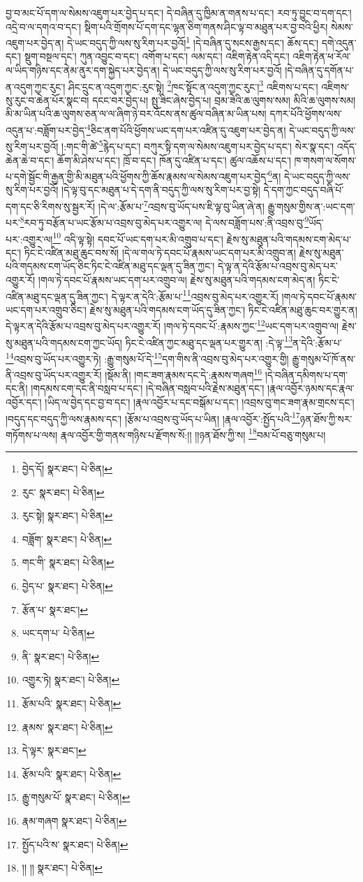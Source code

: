བྱ་བ་མང་པོ་དག་ལ་སེམས་འཇུག་པར་བྱེད་པ་དང་། དེ་བཞིན་དུ་ཁྱིམ་ན་གནས་པ་དང་། རབ་ཏུ་བྱུང་བ་དག་དང་། འདྲེ་བ་ལ་དགའ་བ་དང་། སྡིག་པའི་གྲོགས་པོ་དག་དང་ལྷན་ཅིག་གནས་ཤིང་ལྟ་བ་མཐུན་པར་བྱ་བའི་ཕྱིར། སེམས་འཇུག་པར་བྱེད་ན། དེ་ཡང་བདུད་ཀྱི་ལས་སུ་རིག་པར་བྱའོ།\footnote{བྱེད་དོ།  སྣར་ཐང་།  པེ་ཅིན། } །དེ་བཞིན་དུ་སངས་རྒྱས་དང་། ཆོས་དང་། དགེ་འདུན་དང་། སྡུག་བསྔལ་དང་། ཀུན་འབྱུང་བ་དང་། འགོག་པ་དང་། ལམ་དང་། འཇིག་རྟེན་འདི་དང་། འཇིག་རྟེན་ཕ་རོལ་ལ་ཡིད་གཉིས་དང་ནེམ་ནུར་དག་སྐྱེད་པར་བྱེད་ན། དེ་ཡང་བདུད་ཀྱི་ལས་སུ་རིག་པར་བྱའོ། །དེ་བཞིན་དུ་དགོན་པ་ན་འདུག་ཀྱང་རུང་། ཤིང་དྲུང་ན་འདུག་ཀྱང་:རུང་སྟེ། \footnote{རུང་  སྣར་ཐང་།  པེ་ཅིན། }ཁང་སྟོང་ན་འདུག་ཀྱང་རུང་།\footnote{རུང་སྟེ།  སྣར་ཐང་།  པེ་ཅིན། } འཇིགས་པ་དང་། འཇིགས་སུ་རུང་བ་ཆེན་པོར་སྣང་བ། དངང་བར་བྱེད་པ། སྤུ་ཟིང་ཞེས་བྱེད་པ། བྲམ་ཟེའི་ཆ་ལུགས་སམ། མིའི་ཆ་ལུགས་སམ། མི་མ་ཡིན་པའི་ཆ་ལུགས་ཅན་ལ་ལ་ཞིག་ཉེ་བར་འོངས་ནས་ཚུལ་བཞིན་མ་ཡིན་པས། དཀར་པོའི་ཕྱོགས་ལས་འདུན་པ་:བཟློག་པར་བྱེད་\footnote{བཟློག་  སྣར་ཐང་།  པེ་ཅིན། }ཅིང་ནག་པོའི་ཕྱོགས་ཡང་དག་པར་འཛིན་དུ་འཇུག་པར་བྱེད་ན། དེ་ཡང་བདུད་ཀྱི་ལས་སུ་རིག་པར་བྱའོ། །:གང་གི་ཚེ་\footnote{གང་གི་  སྣར་ཐང་།  པེ་ཅིན། }རྙེད་པ་དང་། བཀུར་སྟི་དག་ལ་སེམས་འཇུག་པར་བྱེད་པ་དང་། སེར་སྣ་དང་། འདོད་ཆེན་ཆེ་བ་དང་། ཆོག་མི་ཤེས་པ་དང་། ཁྲོ་བ་དང་། ཁོན་དུ་འཛིན་པ་དང་། ཚུལ་འཆོས་པ་དང་། ཁ་གསག་ལ་སོགས་པ་དགེ་སྦྱོང་གི་རྒྱན་གྱི་མི་མཐུན་པའི་ཕྱོགས་ཀྱི་ཆོས་རྣམས་ལ་སེམས་འཇུག་པར་བྱེད་\footnote{བྱེད་པ་  སྣར་ཐང་།  པེ་ཅིན། }ན། དེ་ཡང་བདུད་ཀྱི་ལས་སུ་རིག་པར་བྱའོ། །དེ་ལྟ་བུ་དང་མཐུན་པ་དེ་དག་ནི་བདུད་ཀྱི་ལས་སུ་རིག་པར་བྱ་སྟེ། དེ་དག་ཀྱང་བདུད་བཞི་པོ་དག་དང་ཅི་རིགས་སུ་སྦྱར་རོ། །དེ་ལ་:རྩོམ་པ་\footnote{རྩོན་པ་  སྣར་ཐང་། }འབྲས་བུ་ཡོད་པས་ཇི་ལྟ་བུ་ཡིན་ཞེ་ན། རྒྱུ་གསུམ་གྱིས་ན་:ཡང་དག་པར་\footnote{ཡང་དག་པ་  པེ་ཅིན། }རབ་ཏུ་བརྩོན་པ་ཡང་རྩོམ་པ་འབྲས་བུ་མེད་པར་འགྱུར་ལ། དེ་ལས་བཟློག་པས་:ནི་འབྲས་བུ་\footnote{ནི་  སྣར་ཐང་།  པེ་ཅིན། }ཡོད་པར་:འགྱུར་ལ།\footnote{འགྱུར་ཏེ།  སྣར་ཐང་།  པེ་ཅིན། } འདི་ལྟ་སྟེ། དབང་པོ་ཡང་དག་པར་མི་འགྲུབ་པ་དང་། རྗེས་སུ་མཐུན་པའི་གདམས་ངག་མེད་པ་དང་། ཏིང་ངེ་འཛིན་མཐུ་ཆུང་བས་སོ། །དེ་ལ་གལ་ཏེ་དབང་པོ་རྣམས་ཡང་དག་པར་མི་འགྲུབ་ན། རྗེས་སུ་མཐུན་པའི་གདམས་ངག་ཡོད་ཅིང་ཏིང་ངེ་འཛིན་མཐུ་དང་ལྡན་དུ་ཟིན་ཀྱང་། དེ་ལྟ་ན་དེའི་རྩོམ་པ་འབྲས་བུ་མེད་པར་འགྱུར་རོ། །གལ་ཏེ་དབང་པོ་རྣམས་ཡང་དག་པར་འགྲུབ་ལ། རྗེས་སུ་མཐུན་པའི་གདམས་ངག་མེད་ན། ཏིང་ངེ་འཛིན་མཐུ་དང་ལྡན་དུ་ཟིན་ཀྱང་། དེ་ལྟར་ན་དེའི་:རྩོམ་པ་\footnote{རྩོམ་པའི་  སྣར་ཐང་།  པེ་ཅིན། }འབྲས་བུ་མེད་པར་འགྱུར་རོ། །གལ་ཏེ་དབང་པོ་རྣམས་ཡང་དག་པར་འགྲུབ་ཅིང་། རྗེས་སུ་མཐུན་པའི་གདམས་ངག་ཡོད་དུ་ཟིན་ཀྱང་། ཏིང་ངེ་འཛིན་མཐུ་ཆུང་བར་གྱུར་ན། དེ་ལྟར་ན་དེའི་རྩོམ་པ་འབྲས་བུ་མེད་པར་འགྱུར་རོ། །གལ་ཏེ་དབང་པོ་:རྣམས་ཀྱང་\footnote{རྣམས་  སྣར་ཐང་།  པེ་ཅིན། }ཡང་དག་པར་འགྲུབ་ལ། རྗེས་སུ་མཐུན་པའི་གདམས་ངག་ཀྱང་ཡོད། ཏིང་ངེ་འཛིན་ཀྱང་མཐུ་དང་ལྡན་པར་གྱུར་ན། :དེ་ལྟ་\footnote{དེ་ལྟར་  སྣར་ཐང་། }ན་དེའི་:རྩོམ་པ་\footnote{རྩོམ་པའི་  སྣར་ཐང་།  པེ་ཅིན། }འབྲས་བུ་ཡོད་པར་འགྱུར་ཏེ། :རྒྱུ་གསུམ་པོ་དེ་\footnote{རྒྱུ་གསུམ་པོ་  སྣར་ཐང་།  པེ་ཅིན། }དག་གིས་ནི་འབྲས་བུ་མེད་པར་འགྱུར་གྱི། རྒྱུ་གསུམ་པོ་ཁོ་ནས་ནི་འབྲས་བུ་ཡོད་པར་འགྱུར་རོ། །སྡོམ་ནི། །གང་ཟག་རྣམས་དང་དེ་:རྣམས་གཞག\footnote{རྣམ་གཞག  སྣར་ཐང་།  པེ་ཅིན། } །དེ་བཞིན་དམིགས་པ་དག་དང་ནི། །གདམས་ངག་དང་ནི་བསླབ་པ་དང་། །དེ་བཞིན་བསླབ་པའི་རྗེས་མཐུན་དང་། །རྣལ་འབྱོར་ཉམས་དང་རྣལ་འབྱོར་དང་། །ཡིད་ལ་བྱེད་དང་བྱ་བ་དང་། །རྣལ་འབྱོར་པ་དང་བསྒོམ་པ་དང་། །འབྲས་བུ་གང་ཟག་རྣམ་གྲངས་དང་། །བདུད་དང་བདུད་ཀྱི་ལས་རྣམས་དང་། །རྩོམ་པ་འབྲས་བུ་ཡོད་པ་ཡིན། །རྣལ་འབྱོར་:སྤྱོད་པའི་\footnote{སྤྱོད་པའི་ས་  སྣར་ཐང་།  པེ་ཅིན། }ཉན་ཐོས་ཀྱི་སར་གཏོགས་པ་ལས། རྣལ་འབྱོར་གྱི་གནས་གཉིས་པ་རྫོགས་སོ:།། །།ཉན་ཐོས་ཀྱི་ས། \footnote{།། །།   སྣར་ཐང་།  པེ་ཅིན། }བམ་པོ་བཅུ་གསུམ་པ། 